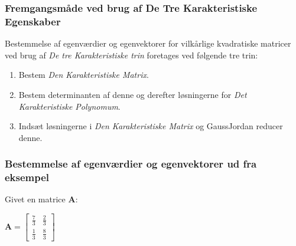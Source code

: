 \documentclass{article}
\newcommand{\cent}[1]{\begin{center}#1\end{center}}
\newcommand{\smallMatrix}[4]{\ensuremath{\begin{bmatrix}
			#1 & #2 \\
			#3 & #4
\end{bmatrix}}}
\begin{document}
  	\subsubsection{Fremgangsmåde ved brug af De Tre Karakteristiske Egenskaber}
  	
  	Bestemmelse af egenværdier og egenvektorer for vilkårlige kvadratiske matricer ved brug af \textit{De tre Karakteristiske trin} foretages ved følgende tre trin:
  	\begin{enumerate}
  		\item  Bestem \textit{Den Karakteristiske Matrix}.
  		\item Bestem determinanten af denne og derefter løsningerne for \textit{Det Karakteristiske Polynomum}.
  		\item Indsæt løsningerne i \textit{Den Karakteristiske Matrix} og GaussJordan reducer denne.
  	\end{enumerate}
  	
	\subsubsection{Bestemmelse af egenværdier og egenvektorer ud fra eksempel}
	
	Givet en matrice \textbf{A}:
	
	\cent{$ \textbf{A} = \smallMatrix{\frac{7}{3}}{\frac{2}{3}}{\frac{1}{3}}{\frac{8}{3}} $}
	
\end{document}
